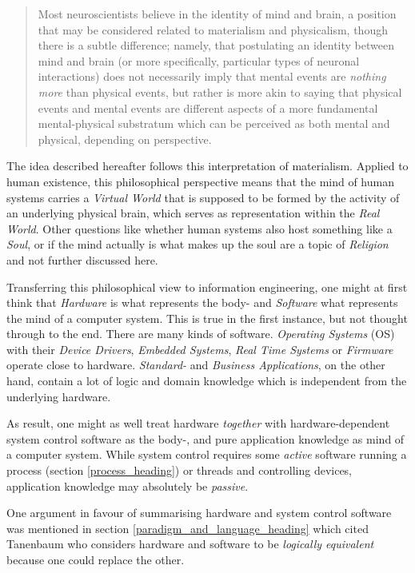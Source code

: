 \begin{quote}
    Most neuroscientists believe in the identity of mind and brain, a position
    that may be considered related to materialism and physicalism, though there
    is a subtle difference; namely, that postulating an identity between mind
    and brain (or more specifically, particular types of neuronal interactions)
    does not necessarily imply that mental events are \emph{nothing more} than
    physical events, but rather is more akin to saying that physical events and
    mental events are different aspects of a more fundamental mental-physical
    substratum which can be perceived as both mental and physical, depending on
    perspective.
\end{quote}

The idea described hereafter follows this interpretation of materialism.
Applied to human existence, this philosophical perspective means that the mind
of human systems carries a \emph{Virtual World} that is supposed to be formed
by the activity of an underlying physical brain, which serves as representation
within the \emph{Real World}. Other questions like whether human systems also
host something like a \emph{Soul}, or if the mind actually is what makes up the
soul are a topic of \emph{Religion} and not further discussed here.

Transferring this philosophical view to information engineering, one might at
first think that \emph{Hardware} is what represents the body- and
\emph{Software} what represents the mind of a computer system. This is true in
the first instance, but not thought through to the end. There are many kinds of
software. \emph{Operating Systems} (OS) with their \emph{Device Drivers},
\emph{Embedded Systems}, \emph{Real Time Systems} or \emph{Firmware} operate
close to hardware. \emph{Standard-} and \emph{Business Applications}, on the
other hand, contain a lot of logic and domain knowledge which is independent
from the underlying hardware.

As result, one might as well treat hardware \emph{together} with
hardware-dependent system control software as the body-, and pure application
knowledge as mind of a computer system. While system control requires some
\emph{active} software running a process (section \ref{process_heading}) or
threads and controlling devices, application knowledge may absolutely be
\emph{passive}.

One argument in favour of summarising hardware and system control software was
mentioned in section \ref{paradigm_and_language_heading} which cited Tanenbaum
\cite{tanenbaum1999} who considers hardware and software to be
\textit{logically equivalent} because one could replace the other.
